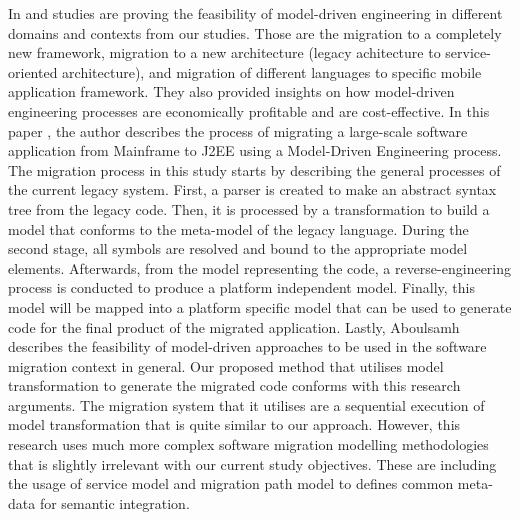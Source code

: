 \documentclass[conference]{IEEEtran}
\begin{document}
In \cite{b9} and \cite{b10} studies are proving the feasibility of model-driven engineering
in different domains and contexts from our studies. Those are the migration to a completely new framework,
migration to a new architecture (legacy achitecture to service-oriented architecture), and migration
of different languages to specific mobile application framework.
They also provided insights on how model-driven engineering processes are economically
profitable and are cost-effective.
\newline \newline
In this paper \cite{b9}, the author describes the process of migrating a large-scale software application from Mainframe to J2EE
using a Model-Driven Engineering process. The migration process in this study starts by describing the general
processes of the current legacy system.
First, a parser is created to make an abstract syntax tree from the legacy code. Then, it is processed
by a transformation to build a model that conforms to the meta-model of the legacy language.
During the second stage, all symbols are resolved and bound to the appropriate model elements.
Afterwards, from the model representing the code, a reverse-engineering process is conducted to produce a platform independent
model. Finally, this model will be mapped into a platform specific model that can be used to generate code
for the final product of the migrated application.
\newline \newline
Lastly, Aboulsamh describes \cite{b10} the feasibility of model-driven approaches to be used in the software migration context in general.
Our proposed method that utilises model transformation to generate the migrated code conforms with this
research arguments. The migration system that it utilises are a sequential execution of model transformation \cite{b10}
that is quite similar to our approach.
However, this research uses much more complex software migration modelling
methodologies that is slightly irrelevant with our current study objectives. These are including
the usage of service model and migration path model to defines common meta-data for semantic integration.
\end{document}
